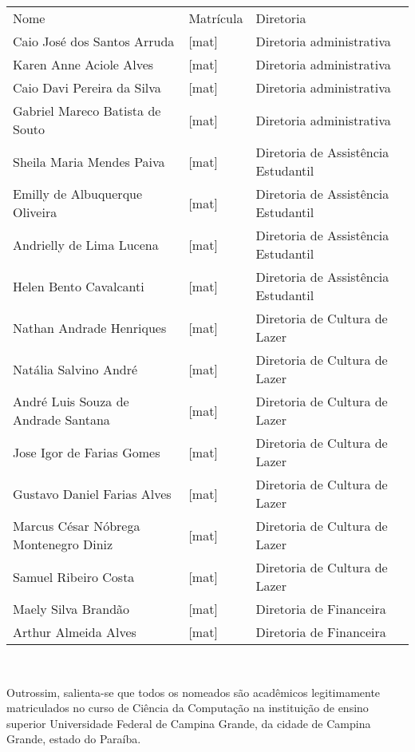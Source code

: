 \documentclass[11pt,letterpaper]{article}
\begin{document}
\begin{center}
\begin{tabular}{|l|l|l|}
\hline
Nome & Matrícula & Diretoria \\
Caio José dos Santos Arruda & [mat] & Diretoria administrativa \\
Karen Anne Aciole Alves & [mat] & Diretoria administrativa \\
Caio Davi Pereira da Silva & [mat] & Diretoria administrativa \\
Gabriel Mareco Batista de Souto & [mat] & Diretoria administrativa \\
Sheila Maria Mendes Paiva & [mat] & Diretoria de Assistência Estudantil \\
Emilly de Albuquerque Oliveira & [mat] & Diretoria de Assistência Estudantil \\
Andrielly de Lima Lucena & [mat] & Diretoria de Assistência Estudantil \\
Helen Bento Cavalcanti & [mat] & Diretoria de Assistência Estudantil \\
Nathan Andrade Henriques & [mat] & Diretoria de Cultura de Lazer \\
Natália Salvino André & [mat] & Diretoria de Cultura de Lazer \\
André Luis Souza de Andrade Santana & [mat] & Diretoria de Cultura de Lazer \\
Jose Igor de Farias Gomes & [mat] & Diretoria de Cultura de Lazer \\
Gustavo Daniel Farias Alves & [mat] & Diretoria de Cultura de Lazer \\
Marcus César Nóbrega Montenegro Diniz & [mat] & Diretoria de Cultura de Lazer \\
Samuel Ribeiro Costa & [mat] & Diretoria de Cultura de Lazer \\
Maely Silva Brandão & [mat] & Diretoria de Financeira \\
Arthur Almeida Alves & [mat] & Diretoria de Financeira \\
\hline
\end{tabular}\\
\end{center}

Outrossim, salienta-se que todos os nomeados são acadêmicos legitimamente matriculados no curso de Ciência da Computação na instituição de ensino superior Universidade Federal de Campina Grande, da cidade de Campina Grande, estado do Paraíba. \\
\end{document}
